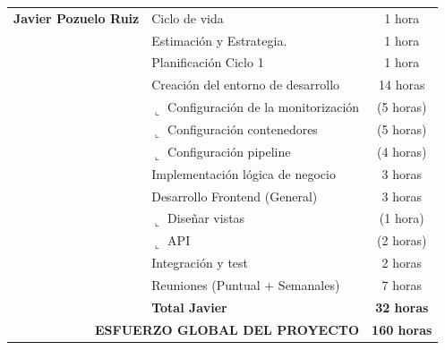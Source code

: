 \documentclass[12pt,a4paper,titlepage]{article}
\begin{document}
\begin{longtable}{@{}llc@{}}
    \textbf{Javier Pozuelo Ruiz} 
     & Ciclo de vida & 1 hora \\
     & Estimación y Estrategia. & 1 hora \\
     & Planificación Ciclo 1 & 1 hora \\
     & Creación del entorno de desarrollo & 14 horas \\
     & $\llcorner$ Configuración de la monitorización & (5 horas) \\
     & $\llcorner$ Configuración contenedores & (5 horas) \\
     & $\llcorner$ Configuración pipeline & (4 horas) \\
     & Implementación lógica de negocio & 3 horas \\
     & Desarrollo Frontend (General) & 3 horas \\
     & $\llcorner$ Diseñar vistas & (1 hora) \\
     & $\llcorner$ API & (2 horas) \\
     & Integración y test & 2 horas \\ 
     & Reuniones (Puntual + Semanales) & 7 horas \\ 
     & \textbf{Total Javier} & \textbf{32 horas} \\ \midrule\midrule

    \multicolumn{2}{r}{\textbf{ESFUERZO GLOBAL DEL PROYECTO}} & \textbf{160 horas} \\ 
\end{longtable}
\end{document}
